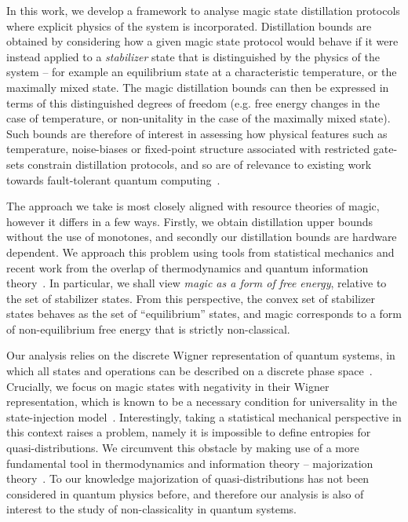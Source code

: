 \documentclass[pra,
aps,
twocolumn,
superscriptaddress,
groupedaddress,
nofootinbib,
reprint
]{revtex4-1}
\begin{document}
In this work, we develop a framework to analyse magic state distillation protocols where explicit physics of the system is incorporated.  Distillation bounds are obtained by considering how a given magic state protocol would behave if it were instead applied to a \emph{stabilizer} state that is distinguished by the physics of the system -- for example an equilibrium state at a characteristic temperature, or the maximally mixed state. The magic distillation bounds can then be expressed in terms of this distinguished degrees of freedom (e.g. free energy changes in the case of temperature, or non-unitality in the case of the maximally mixed state). Such bounds are therefore of interest in assessing how physical features such as temperature, noise-biases or fixed-point structure associated with restricted gate-sets constrain distillation protocols, and so are of relevance to existing work towards fault-tolerant quantum computing~\cite{Aliferis_2008, Stephens_2013, Li_2015, Babbush_2018, Tuckett_2019, Guillaud_2019, Fowler_2019}. 

The approach we take is most closely aligned with resource theories of magic, however it differs in a few ways. Firstly, we obtain distillation upper bounds without the use of monotones, and secondly our distillation bounds are hardware dependent. We approach this problem using tools from statistical mechanics and recent work from the overlap of thermodynamics and quantum information theory~\cite{cit:janzing, cit:horodecki2, Brandao_2015, Vinjanampathy_2016, Goold_2016, cit:lostaglio, cit:gour}. In particular, we shall view \emph{magic as a form of free energy}, relative to the set of stabilizer states. From this perspective, the convex set of stabilizer states behaves as the set of ``equilibrium'' states, and magic corresponds to a form of non-equilibrium free energy that is strictly non-classical.

Our analysis relies on the discrete Wigner representation of quantum systems, in which all states and operations can be described on a discrete phase space~\cite{Ferrie_2008, Okay_2021}. Crucially, we focus on magic states with negativity in their Wigner representation, which is known to be a necessary condition for universality in the state-injection model~\cite{cit:veitch, cit:mari, cit:gottesman, cit:knill, Campbell_2011}. Interestingly, taking a statistical mechanical perspective in this context raises a problem, namely it is impossible to define entropies for quasi-distributions. We circumvent this obstacle by making use of a more fundamental tool in thermodynamics and information theory -- majorization theory~\cite{cit:marshall, Veinott_1971, Ruch_1976}. To our knowledge majorization of quasi-distributions has not been considered in quantum physics before, and therefore our analysis is also of interest to the study of non-classicality in quantum systems.
\end{document}
